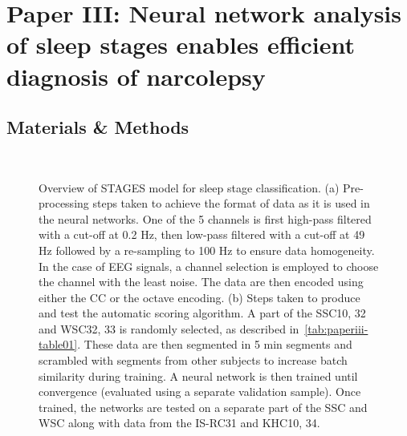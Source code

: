 \section{Paper III: Neural network analysis of sleep stages enables efficient diagnosis of narcolepsy}\label{sec:paperiii}

\subsection{Materials \& Methods}
\begin{figure}[t]
    \myfloatalign   
      \\
    \caption[STAGES model for sleep staging]{Overview of STAGES model for sleep stage classification. (a) Pre-processing steps taken to achieve the format of data as it is used in the neural networks. One of the 5 channels is first high-pass filtered with a cut-off at 0.2 Hz, then low-pass filtered with a cut-off at 49 Hz followed by a re-sampling to 100 Hz to ensure data homogeneity. In the case of EEG signals, a channel selection is employed to choose the channel with the least noise. The data are then encoded using either the CC or the octave encoding. (b) Steps taken to produce and test the automatic scoring algorithm. A part of the SSC10, 32 and WSC32, 33 is randomly selected, as described in~\cref{tab:paperiii-table01}. These data are then segmented in 5 min segments and scrambled with segments from other subjects to increase batch similarity during training. A neural network is then trained until convergence (evaluated using a separate validation sample). Once trained, the networks are tested on a separate part of the SSC and WSC along with data from the IS-RC31 and KHC10, 34.}
    \label{fig:paperiii-figure05}
\end{figure}
